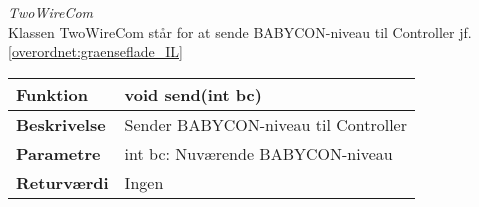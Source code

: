 \textit{TwoWireCom} \\
Klassen TwoWireCom står for at sende BABYCON-niveau til Controller jf. \ref{overordnet:graenseflade_IL}
\begin{center}
    \begin{tabular}{ | l | p{10cm} |}
    \hline
    \textbf{Funktion}	 	& void send(int bc)								\\ \hline
    \textbf{Beskrivelse} 	& Sender BABYCON-niveau til Controller						\\ \hline
    \textbf{Parametre}		& int bc: Nuværende BABYCON-niveau							 					    \\ \hline
    \textbf{Returværdi} 	& Ingen														     \\ \hline
    \end{tabular}
\end{center}
